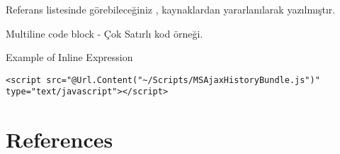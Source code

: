 \documentclass[10pt,a4paper]{article}
\begin{document}
Referans listesinde görebileceğiniz \cite{Haack2011},\cite{Haley2010} kaynaklardan
yararlanılarak yazılmıştır.




Multiline code block - Çok Satırlı kod örneği.










Example of Inline Expression

\begin{lstlisting}
<script src="@Url.Content("~/Scripts/MSAjaxHistoryBundle.js")" type="text/javascript"></script>
\end{lstlisting}






\section*{References}





% 

\end{document}
